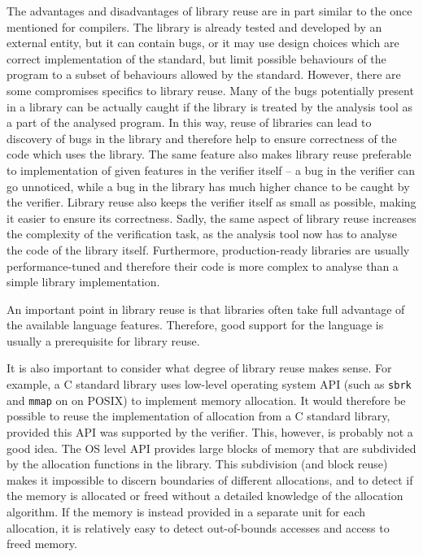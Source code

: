 The advantages and disadvantages of library reuse are in part similar to the
once mentioned for compilers.
The library is already tested and developed by
an external entity, but it can contain bugs, or it may use design choices which
are correct implementation of the standard, but limit possible behaviours of
the program to a subset of behaviours allowed by the standard.
However, there are some compromises specifics to library reuse.
Many of the bugs potentially present in a library can be actually caught if the
library is treated by the analysis tool as a part of the analysed program.
In this way, reuse of libraries can lead to discovery of bugs in the library and
therefore help to ensure correctness of the code which uses the
library.
The same feature also makes library reuse preferable to implementation of given features in the verifier itself -- a bug in the verifier can go unnoticed, while a bug in the library has much higher chance to be caught by the verifier.
Library reuse also keeps the verifier itself as small as possible, making it easier to ensure its correctness.
Sadly, the same aspect of library reuse increases the complexity of the verification task, as the analysis tool now has to analyse the code of the library itself.
Furthermore, production-ready libraries are usually performance-tuned and therefore their code is more complex to analyse than a simple library implementation.

An important point in library reuse is that libraries often take full advantage of the available language features.
Therefore, good support for the language is usually a prerequisite for library reuse.

It is also important to consider what degree of library reuse makes sense.
For example, a C standard library uses low-level operating system API (such as
\texttt{sbrk} and \texttt{mmap} on on POSIX) to implement memory allocation.
It would therefore be possible to reuse the implementation of allocation from a C
standard library, provided this API was supported by the verifier.
This, however, is probably not a good idea.
The OS level API provides large blocks of memory that are subdivided by the allocation functions in the library.
This subdivision (and block reuse) makes it impossible to discern boundaries of different allocations, and to detect if the memory is allocated or freed without a detailed knowledge of the allocation algorithm.
If the memory is instead provided in a separate unit for each allocation, it is relatively easy to detect out-of-bounds accesses and access to freed memory.

